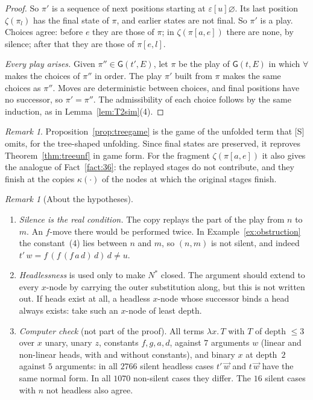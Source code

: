 \documentclass[11pt]{article}
\newcommand{\Gm}{\mathsf{G}}
\newcommand{\iv}[2]{\pi[#1,#2]}
\theoremstyle{plain}
\theoremstyle{definition}
\theoremstyle{remark}
\newtheorem{remark}[theorem]{Remark}
\begin{document}
\begin{proof}
So $\pi'$ is a sequence of next positions starting at
$\varepsilon[u]\varnothing$.  Its last position $\zeta(\pi_l)$ has the
final state of $\pi$, and earlier states are not final.  So $\pi'$ is a
play.  Choices agree: before $e$ they are those of $\pi$; in
$\zeta(\iv ae)$ there are none, by silence; after that they are those
of $\iv el$.

\emph{Every play arises.}  Given $\pi''\in\Gm(t',E)$, let $\pi$ be the
play of $\Gm(t,E)$ in which $\forall$ makes the choices of $\pi''$ in
order.  The play $\pi'$ built from $\pi$ makes the same choices as
$\pi''$.  Moves are deterministic between choices, and final positions
have no successor, so $\pi'=\pi''$.  The admissibility of each choice
follows by the same induction, as in Lemma~\ref{lem:T2sim}(4).
\end{proof}

\begin{remark}
Proposition~\ref{prop:treegame} is the game of the unfolded term that
[S] omits, for the tree-shaped unfolding.  Since final states are
preserved, it reproves Theorem~\ref{thm:treeunf} in game form.  For the
fragment $\zeta(\iv ae)$ it also gives the analogue of
Fact~\ref{fact:36}: the replayed stages do not contribute, and they
finish at the copies $\kappa(\cdot)$ of the nodes at which the original
stages finish.
\end{remark}

\begin{remark}[About the hypotheses]
\begin{enumerate}
\item \emph{Silence is the real condition.}  The copy replays the part
  of the play from $n$ to $m$.  An $f$-move there would be performed
  twice.  In Example~\ref{ex:obstruction} the constant~(4) lies between
  $n$ and $m$, so $(n,m)$ is not silent, and indeed
  $t'\,w=f\,(f\,(f\,a\,d)\,d)\,d\ne u$.
\item \emph{Headlessness} is used only to make $N^*$ closed.  The
  argument should extend to every $x$-node by carrying the outer
  substitution along, but this is not written out.  If heads exist at
  all, a headless $x$-node whose successor binds a head always exists:
  take such an $x$-node of least depth.
\item \emph{Computer check} (not part of the proof).  All terms
  $\lambda x.\,T$ with $T$ of depth $\le3$ over $x$ unary, unary $z$,
  constants $f,g,a,d$, against $7$ arguments $w$ (linear and
  non-linear heads, with and without constants), and binary $x$ at
  depth~$2$ against $5$ arguments: in all $2766$ silent headless
  cases $t'\,\vec w$ and $t\,\vec w$ have the same normal form.  In all
  $1070$ non-silent cases they differ.  The $16$ silent cases with $n$
  not headless also agree.
\end{enumerate}
\end{remark}
\end{document}
